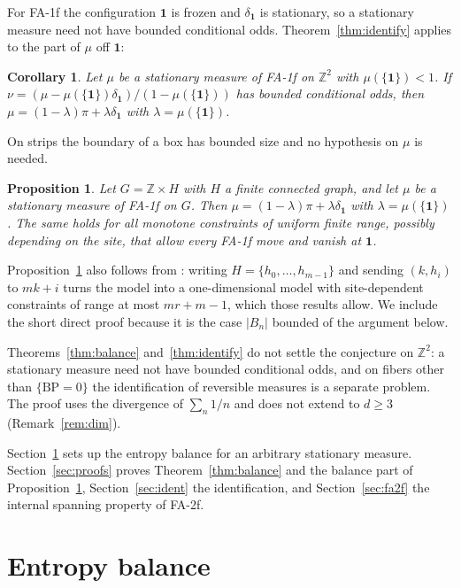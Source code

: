 \documentclass[11pt]{amsart}
\newtheorem{proposition}[theorem]{Proposition}
\newtheorem{corollary}[theorem]{Corollary}
\theoremstyle{remark}
\newcommand{\Z}{\mathbb{Z}}
\newcommand{\BP}{\mathrm{BP}}
\begin{document}
For FA-1f the configuration $\mathbf 1$ is frozen and $\delta_{\mathbf 1}$ is stationary, so a stationary measure
need not have bounded conditional odds. Theorem~\ref{thm:identify} applies to the part of $\mu$ off $\mathbf 1$:

\begin{corollary}\label{cor:fa1f}
Let $\mu$ be a stationary measure of FA-1f on $\Z^2$ with $\mu(\{\mathbf 1\})<1$. If
$\nu=(\mu-\mu(\{\mathbf 1\})\delta_{\mathbf 1})/(1-\mu(\{\mathbf 1\}))$ has bounded conditional odds, then
$\mu=(1-\lambda)\pi+\lambda\delta_{\mathbf 1}$ with $\lambda=\mu(\{\mathbf 1\})$.
\end{corollary}

On strips the boundary of a box has bounded size and no hypothesis on $\mu$ is needed.

\begin{proposition}\label{prop:strip}
Let $G=\Z\times H$ with $H$ a finite connected graph, and let $\mu$ be a stationary measure of FA-1f on $G$. Then
$\mu=(1-\lambda)\pi+\lambda\delta_{\mathbf 1}$ with $\lambda=\mu(\{\mathbf 1\})$. The same holds for all monotone
constraints of uniform finite range, possibly depending on the site, that allow every FA-1f move and vanish at
$\mathbf 1$.
\end{proposition}

Proposition~\ref{prop:strip} also follows from \cite[Theorem~2.5 and Lemma~2.8]{MST25}: writing
$H=\{h_0,\dots,h_{m-1}\}$ and sending $(k,h_i)$ to $mk+i$ turns the model into a one-dimensional model with
site-dependent constraints of range at most $mr+m-1$, which those results allow. We include the short direct proof
because it is the case $|B_n|$ bounded of the argument below.

Theorems~\ref{thm:balance} and~\ref{thm:identify} do not settle the conjecture on $\Z^2$: a stationary measure need
not have bounded conditional odds, and on fibers other than $\{\BP=0\}$ the identification of reversible measures is a
separate problem. The proof uses the divergence of $\sum_n1/n$ and does not extend to $d\ge3$
(Remark~\ref{rem:dim}).

Section~\ref{sec:entropy} sets up the entropy balance for an arbitrary stationary measure. Section~\ref{sec:proofs}
proves Theorem~\ref{thm:balance} and the balance part of Proposition~\ref{prop:strip}, Section~\ref{sec:ident} the
identification, and Section~\ref{sec:fa2f} the internal spanning property of FA-2f.

\section{Entropy balance}\label{sec:entropy}
\end{document}
